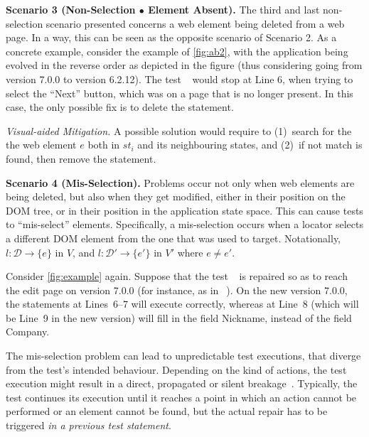 \noindent
\textbf{Scenario 3 (Non-Selection $\bullet$ Element Absent).} 
%
The third and last non-selection scenario presented concerns a web element being deleted from a web page. In a way, this can be seen as the opposite scenario of Scenario 2. 
As a concrete example, consider the example of \autoref{fig:ab2}, with the application being evolved in the reverse order as depicted in the figure (thus considering going from version 7.0.0 to version 6.2.12). The test~\textcircled{} would stop at Line 6, when trying to select the ``Next'' button, which was on a page that is no longer present. In this case, the only possible fix is to delete the statement.

\noindent
\textit{Visual-aided Mitigation.}
A possible solution would require to (1)~search for the the web element $e$ both in $st_i$ and its neighbouring states, and (2)~if not match is found, then remove the statement.

\noindent
\textbf{Scenario 4 (Mis-Selection).}\label{sec:misselection}
Problems occur not only when web elements are being deleted, but also when they get modified, either in their position on the DOM tree, or in their position in the application state space. This can cause tests to ``mis-select'' elements.
Specifically, a mis-selection occurs when a locator selects a different DOM element from the one that was used to target. 
Notationally, $l: \mathcal{D} \rightarrow \{e\}$ in $V$, and $l: \mathcal{D}' \rightarrow \{e'\}$ in $V'$ where $e \ne e'$.

Consider \autoref{fig:example} again. 
Suppose that the test~\textcircled{} is repaired so as to reach the edit page on version 7.0.0 (for instance, as in~\textcircled{}). On the new version 7.0.0, the statements at Lines~6--7 will execute correctly, whereas at Line~8 (which will be Line~9 in the new version) will fill in the field Nickname, instead of the field Company. %
 
The mis-selection problem can lead to unpredictable test executions, that diverge from the test's intended behaviour. Depending on the kind of actions, the test execution might result in a direct, propagated or silent breakage~\cite{Hammoudi-2016-ICST}. Typically, the test continues its execution until it reaches a point in which an action cannot be performed or an element cannot be found, but the actual repair has to be triggered \textit{in a previous test statement}.

